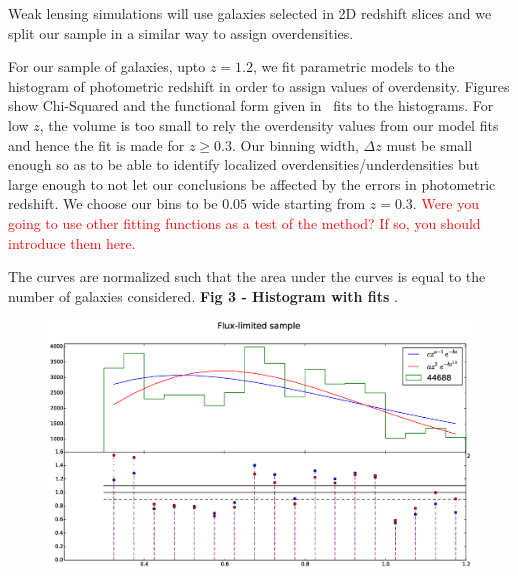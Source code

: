 \documentclass[twocolumn,useAMS,usenatbib]{mn2e}
\newcommand{\rachel}[1]{{\textcolor{red}{#1}}}
\begin{document}
Weak lensing simulations will use galaxies selected in 2D redshift slices and
we split our sample in a similar way to assign overdensities.


For our sample of galaxies, upto $z=1.2$, we fit parametric models to the histogram of photometric redshift in order to assign values of overdensity. Figures show Chi-Squared and the functional form given in~\cite{Redshift_modelling} fits to the histograms.
For low $z$, the volume is too small to rely the overdensity values from our model fits and hence the fit is made for $z \ge 0.3$. Our binning width, $\Delta z$ must be small enough so as to be able to identify localized overdensities/underdensities but large enough to not let our conclusions be affected by the errors in photometric redshift. 
We choose our bins to be $0.05$ wide starting from $z=0.3$. 
\rachel{Were you going to use other fitting functions as a test of the
  method?  If so, you should introduce them here.}

The curves are normalized such that the area under the curves is equal to the number of galaxies considered.
{\bf Fig 3 - Histogram with fits }. \\
\begin{figure}
 \centering
  \includegraphics[width=\columnwidth]{redshift_fluxlimited}
  \label{fig:redshift_fluxlimited}
  \caption{}
\end{figure}
\end{document}
